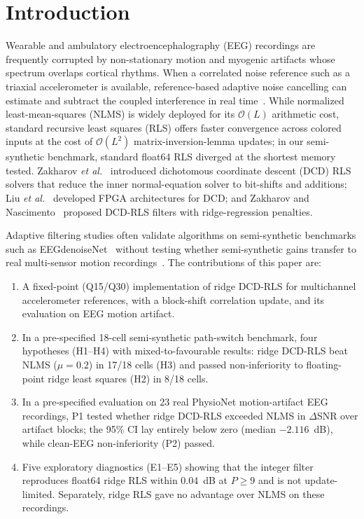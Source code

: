 \documentclass[conference]{IEEEtran}
\begin{document}
\section{Introduction}
Wearable and ambulatory electroencephalography (EEG) recordings are frequently corrupted by non-stationary motion and myogenic artifacts whose spectrum overlaps cortical rhythms. When a correlated noise reference such as a triaxial accelerometer is available, reference-based adaptive noise cancelling can estimate and subtract the coupled interference in real time~\cite{widrow1975}. While normalized least-mean-squares (NLMS) is widely deployed for its $\mathcal{O}(L)$ arithmetic cost, standard recursive least squares (RLS) offers faster convergence across colored inputs at the cost of $\mathcal{O}(L^2)$ matrix-inversion-lemma updates; in our semi-synthetic benchmark, standard float64 RLS diverged at the shortest memory tested. Zakharov \emph{et al.}~\cite{zakharov2008} introduced dichotomous coordinate descent (DCD) RLS solvers that reduce the inner normal-equation solver to bit-shifts and additions; Liu \emph{et al.}~\cite{liu2009} developed FPGA architectures for DCD; and Zakharov and Nascimento~\cite{zakharov2013} proposed DCD-RLS filters with ridge-regression penalties.

Adaptive filtering studies often validate algorithms on semi-synthetic benchmarks such as EEGdenoiseNet~\cite{zhang2021} without testing whether semi-synthetic gains transfer to real multi-sensor motion recordings~\cite{sweeney2012,sweeney2014}. The contributions of this paper are:
\begin{enumerate}
\item A fixed-point (Q15/Q30) implementation of ridge DCD-RLS for multichannel accelerometer references, with a block-shift correlation update, and its evaluation on EEG motion artifact.
\item In a pre-specified 18-cell semi-synthetic path-switch benchmark, four hypotheses (H1--H4) with mixed-to-favourable results: ridge DCD-RLS beat NLMS ($\mu = 0.2$) in 17/18 cells (H3) and passed non-inferiority to floating-point ridge least squares (H2) in 8/18 cells.
\item In a pre-specified evaluation on 23 real PhysioNet motion-artifact EEG recordings, P1 tested whether ridge DCD-RLS exceeded NLMS in $\Delta$SNR over artifact blocks; the 95\% CI lay entirely below zero (median $-2.116$~dB), while clean-EEG non-inferiority (P2) passed.
\item Five exploratory diagnostics (E1--E5) showing that the integer filter reproduces float64 ridge RLS within 0.04~dB at $P \ge 9$ and is not update-limited. Separately, ridge RLS gave no advantage over NLMS on these recordings.
\end{enumerate}
\end{document}
